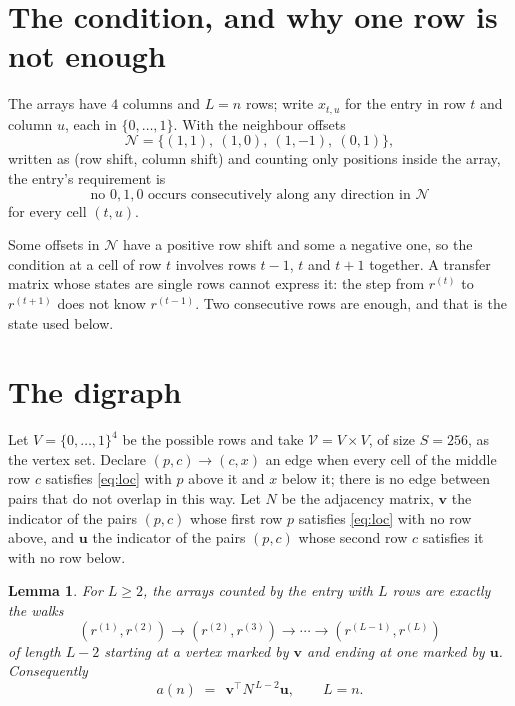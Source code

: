 \documentclass[11pt,a4paper]{article}
\theoremstyle{plain}
\newtheorem{lemma}[theorem]{Lemma}
\theoremstyle{definition}
\begin{document}
\section{The condition, and why one row is not enough}

The arrays have $4$ columns and $L=n$ rows; write $x_{t,u}$ for the entry in
row $t$ and column $u$, each in $\{0,\dots,1\}$. With the neighbour offsets
\[
\mathcal N=\{(1,1),\ (1,0),\ (1,-1),\ (0,1)\},
\]
written as (row shift, column shift) and counting only positions inside the array, the
entry's requirement is
\begin{equation}\label{eq:loc}
\text{no }0,1,0\text{ occurs consecutively along any direction in }\mathcal N
\end{equation}
for every cell $(t,u)$.

Some offsets in $\mathcal N$ have a positive row shift and some a negative one, so the
condition at a cell of row $t$ involves rows $t-1$, $t$ and $t+1$ together. A transfer
matrix whose states are single rows cannot express it: the step from $r^{(t)}$ to
$r^{(t+1)}$ does not know $r^{(t-1)}$. Two consecutive rows are enough, and that is
the state used below.

\section{The digraph}

Let $V=\{0,\dots,1\}^{4}$ be the possible rows and take
$\mathcal V=V\times V$, of size $S=256$, as the vertex set. Declare $(p,c)\to(c,x)$ an edge
when every cell of the middle row $c$ satisfies \eqref{eq:loc} with $p$ above it and $x$
below it; there is no edge between pairs that do not overlap in this way. Let $N$ be the
adjacency matrix, $\mathbf{v}$ the indicator of the pairs $(p,c)$ whose first row $p$
satisfies \eqref{eq:loc} with no row above, and $\mathbf{u}$ the indicator of
the pairs $(p,c)$ whose second row $c$ satisfies it with no row below.

\begin{lemma}\label{lem:walk}
For $L\ge2$, the arrays counted by the entry with $L$ rows are exactly the walks
\[
(r^{(1)},r^{(2)})\to(r^{(2)},r^{(3)})\to\cdots\to(r^{(L-1)},r^{(L)})
\]
of length $L-2$ starting at a vertex marked by $\mathbf{v}$ and ending at one marked by
$\mathbf{u}$. Consequently
\[
a(n)\;=\;\,\mathbf{v}^{\!\top}N^{\,L-2}\mathbf{u},\qquad L=n .
\]
\end{lemma}
\end{document}
